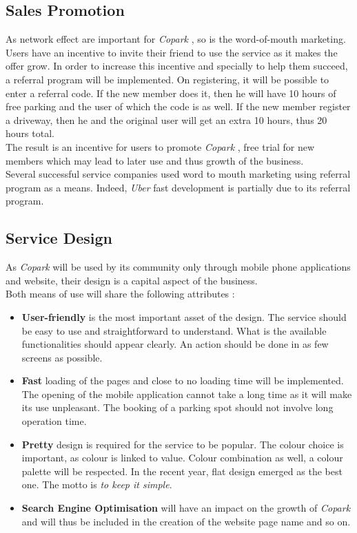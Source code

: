 \documentclass[12pt,a4paper,oneside]{book}
\newcommand{\bp}{\textit{Copark }}
\begin{document}
\subsection{Sales Promotion}
As network effect are important for \bp, so is the word-of-mouth marketing.\\
Users have an incentive to invite their friend to use the service as it makes the offer grow. In order to increase this incentive and specially to help them succeed, a referral program will be implemented. On registering, it will be possible to enter a referral code. If the new member does it, then he will have 10 hours of free parking and the user of which the code is as well. If the new member register a driveway, then he and the original user will get an extra 10 hours, thus 20 hours total.\\
The result is an incentive for users to promote \bp, free trial for new members which may lead to later use and thus growth of the business.\\

Several successful service companies used word to mouth marketing using referral program as a means. Indeed, \textit{Uber} fast development is partially due to its referral program.\cite{uberef}

\subsection{Service Design}
As \bp will be used by its community only through mobile phone applications and website, their design is a capital aspect of the business.\\

Both means of use will share the following attributes :
\begin{itemize}
\item \textbf{User-friendly} is the most important asset of the design. The service should be easy to use and straightforward to understand. What is the available functionalities should appear clearly. An action should be done in as few screens as possible.
\item \textbf{Fast} loading of the pages and close to no loading time will be implemented. The opening of the mobile application cannot take a long time as it will make its use unpleasant. The booking of a parking spot should not involve long operation time.
\item \textbf{Pretty} design is required for the service to be popular. The colour choice is important, as colour is linked to value. Colour combination as well, a colour palette will be respected. In the recent year, flat design emerged as the best one. The motto is \textit{to keep it simple}.
\item \textbf{Search Engine Optimisation} will have an impact on the growth of \bp and will thus be included in the creation of the website page name and so on.
\end{itemize}
\end{document}
